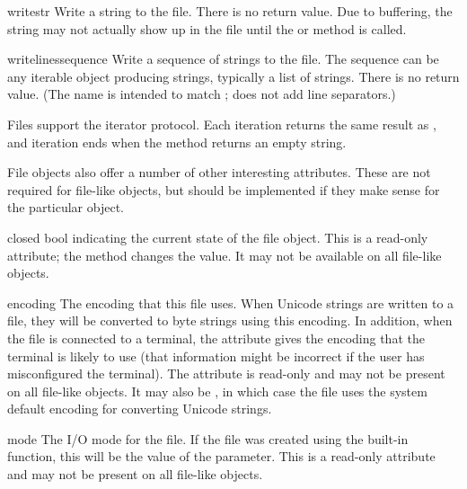 \begin{methoddesc}[file]{write}{str}
  Write a string to the file.  There is no return value.  Due to
  buffering, the string may not actually show up in the file until
  the  or  method is called.
\end{methoddesc}

\begin{methoddesc}[file]{writelines}{sequence}
  Write a sequence of strings to the file.  The sequence can be any
  iterable object producing strings, typically a list of strings.
  There is no return value.
  (The name is intended to match ;
   does not add line separators.)
\end{methoddesc}


Files support the iterator protocol.  Each iteration returns the same
result as , and iteration ends when the
 method returns an empty string.


File objects also offer a number of other interesting attributes.
These are not required for file-like objects, but should be
implemented if they make sense for the particular object.

\begin{memberdesc}[file]{closed}
bool indicating the current state of the file object.  This is a
read-only attribute; the  method changes the value.
It may not be available on all file-like objects.
\end{memberdesc}

\begin{memberdesc}[file]{encoding}
The encoding that this file uses. When Unicode strings are written
to a file, they will be converted to byte strings using this encoding.
In addition, when the file is connected to a terminal, the attribute
gives the encoding that the terminal is likely to use (that 
information might be incorrect if the user has misconfigured the 
terminal). The attribute is read-only and may not be present on
all file-like objects. It may also be , in which case
the file uses the system default encoding for converting Unicode
strings.

\end{memberdesc}

\begin{memberdesc}[file]{mode}
The I/O mode for the file.  If the file was created using the
 built-in function, this will be the value of the
 parameter.  This is a read-only attribute and may not be
present on all file-like objects.
\end{memberdesc}

